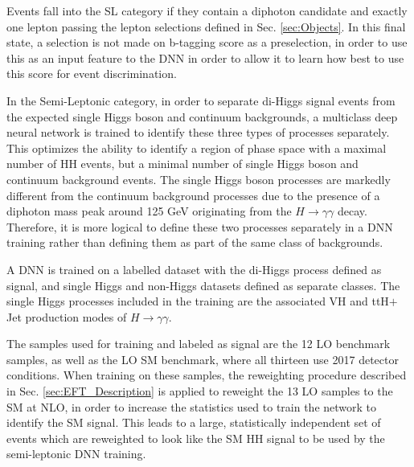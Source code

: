Events fall into the SL category if they contain a diphoton candidate and exactly one lepton passing the lepton selections defined in Sec. \ref{sec:Objects}. In this final state, 
a selection is not made on b-tagging score as a preselection, in order to use this as an input feature to the DNN in order to allow it to learn how best to use this score for event discrimination.


In the Semi-Leptonic category, in order to separate di-Higgs signal events from the expected single Higgs boson and continuum backgrounds, a multiclass deep neural network is 
trained to identify these three types of processes separately. This optimizes the ability to identify a region of phase space with a maximal number of HH events,
but a minimal number of single Higgs boson and continuum background events. The single Higgs boson processes are markedly different from the continuum background 
processes due to the presence of a diphoton mass peak around 125 GeV originating from the $H\rightarrow\gamma\gamma$ decay. Therefore, 
it is more logical to define these two processes separately in a DNN training rather
than defining them as part of the same class of backgrounds. 

A DNN is trained on a labelled dataset with the di-Higgs process defined as signal, and single Higgs and non-Higgs datasets defined as separate classes. The single Higgs processes
included in the training are the associated VH and ttH$+$Jet production modes of $H\rightarrow\gamma\gamma$.

The samples used for training and labeled as signal are the 12 LO benchmark samples, as well as the LO SM benchmark, where all thirteen use 2017 detector conditions.
When training on these samples, the reweighting procedure described in Sec. \ref{sec:EFT_Description}
is applied to reweight the 13 LO samples to the SM at NLO, in order to increase the statistics used to train the network to identify the SM signal. This leads to a large, statistically independent 
set of events which are reweighted to look like the SM HH signal to be used by the semi-leptonic DNN training. 


